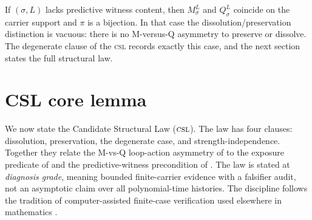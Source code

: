 \documentclass[11pt]{article}
\newcommand{\CSL}{\textsc{csl}}            \newcommand{\CSLcore}{Candidate Structural Law}
\newcommand{\Substrate}{\sigma}             \newcommand{\Lift}{L}                       \newcommand{\LiftState}{\sigma_{L}}         \newcommand{\HistorySpace}{H_{\Substrate}^{\Lift}}
\newcommand{\Qquotient}{Q_{\Substrate}^{\Lift}}
\newcommand{\Mquotient}{M_{\Substrate}^{\Lift}}
\newcommand{\ForgetWitnessMap}{\pi}
\newcommand{\DiagnosisGrade}{\emph{diagnosis grade}}
\theoremstyle{definition}
\begin{document}
If \((\Substrate,\Lift)\) lacks predictive witness content, then
\(\Mquotient\) and \(\Qquotient\) coincide on the carrier support and
\(\ForgetWitnessMap\) is a bijection.  In that case the
dissolution/preservation distinction is vacuous: there is no
M-versus-Q asymmetry to preserve or dissolve.  The degenerate clause
of the \CSL{} records exactly this case, and the next section states
the full structural law.
 

\section{CSL core lemma}
\label{sec:csl-core}

We now state the \CSLcore{} (\(\CSL\)).  The law has four clauses:
dissolution, preservation, the degenerate case, and
strength-independence.  Together they relate the M-vs-Q loop-action
asymmetry of  to the exposure predicate of
 and the predictive-witness precondition
of .  The law is stated at
\DiagnosisGrade{}, meaning bounded finite-carrier evidence with a
falsifier audit, not an asymptotic claim over all polynomial-time
histories.  The discipline follows the tradition of computer-assisted
finite-case verification used elsewhere in mathematics
\citep{AppelHaken1989FourColorable,HalesEtAl2017Flyspeck,BaileyEtAl2007ExperimentalMath}.
\end{document}
